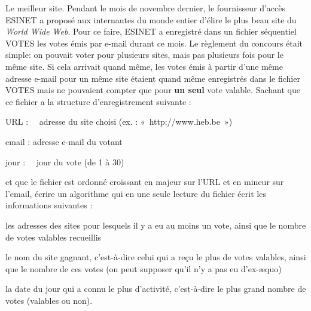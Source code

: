 \begin{Exercice}{Le meilleur site.}
	Pendant le mois de novembre dernier, le fournisseur d’accès ESINET a
	proposé aux internautes du monde entier d’élire le plus beau site du
	\textit{World Wide Web}. Pour ce faire, ESINET a enregistré dans un
	fichier séquentiel VOTES les votes émis par e-mail durant ce mois. Le
	règlement du concours était simple: on pouvait voter pour plusieurs
	sites, mais pas plusieurs fois pour le même site. Si cela arrivait
	quand même, les votes émis à partir d’une même adresse e-mail pour un
	même site étaient quand même enregistrés dans le fichier VOTES mais ne
	pouvaient compter que pour \textbf{un seul} vote valable. Sachant que
	ce fichier a la structure d’enregistrement suivante :

	{	URL : \ \ adresse du site choisi (ex. : «~http://www.heb.be~»)}

	{	email : adresse e-mail du votant}

	{	jour : \ \ jour du vote (de 1 à 30)}

	et que le fichier est ordonné croissant en majeur sur
	l'URL et en mineur sur l'email,
	écrire un algorithme qui en une seule lecture du fichier écrit les
	informations suivantes :

	\begin{liste}
		\item 
			les adresses des sites pour lesquels il y a eu au moins un vote, ainsi
			que le nombre de votes valables recueillis 
		\item 
			le nom du site gagnant, c’est-à-dire celui qui a reçu le plus de votes
			valables, ainsi que le nombre de ces votes (on peut supposer qu’il n’y
			a pas eu d’ex-æquo)
		\item 
			la date du jour qui a connu le plus d’activité, c’est-à-dire le plus
			grand nombre de votes (valables ou non).
	\end{liste}
\end{Exercice}	

